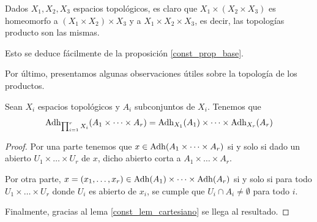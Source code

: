 \begin{obs}[Asociatividad]
	Dados $X_1,X_2,X_3$ espacios topológicos, es claro que $X_1\times(X_2\times X_3)$ es homeomorfo a $(X_1\times X_2)\times X_3$ y a $X_1\times X_2\times X_3$, es decir, las topologías producto son las mismas.
	
	Esto se deduce fácilmente de la proposición \ref{const_prop_base}.
\end{obs}
Por último, presentamos algunas observaciones útiles sobre la topología de los productos.
\begin{prop}[Adherencia]
	\label{const_prop_adherencia}
	Sean $X_i$ espacios topológicos y $A_i$ subconjuntos de $X_i$. Tenemos que
	\[\operatorname{\mathrm{Adh}}_{\prod_{i=1}^r X_i}(A_1 \times \dots \times A_r) = \operatorname{\mathrm{Adh}}_{X_1}(A_1) \times \dots \times \operatorname{\mathrm{Adh}}_{X_r}(A_r)\]
\end{prop}
\begin{proof}
	 Por una parte tenemos que $x \in \operatorname{\mathrm{Adh}}(A_1 \times \dots \times A_r)$ si y solo si dado un abierto $U_1 \times \dots \times U_r$ de $x$, dicho abierto corta a $A_1 \times \dots \times A_r$.
	 
	 Por otra parte, $x=(x_1,\dots,x_r) \in  \operatorname{\mathrm{Adh}}(A_1) \times \dots \times \operatorname{\mathrm{Adh}}(A_r)$ si y solo si para todo $U_1 \times \dots \times U_r$ donde $U_i$ es abierto de $x_i$, se cumple que $U_i \cap A_i \neq \emptyset$ para todo $i$.
	 
	 Finalmente, gracias al lema \ref{const_lem_cartesiano} se llega al resultado.
\end{proof}

